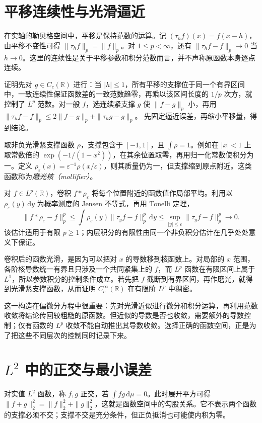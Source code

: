 \section{平移连续性与光滑逼近}
在实轴的勒贝格空间中，平移是保持范数的运算。记 $(\tau_hf)(x)=f(x-h)$，由平移不变性可得 $\|\tau_hf\|_p=\|f\|_p$。对 $1\leq p<\infty$，还有
$\|\tau_hf-f\|_p\to0$ 当 $h\to0$。这里的连续性是关于平移参数和积分范数而言，并不声称原函数本身逐点连续。

证明先对 $g\in C_c(\mathbb R)$ 进行：当 $|h|\leq1$，所有平移的支撑位于同一个有界区间中，一致连续性保证函数差的一致范数趋零，再乘以该区间长度的 $1/p$ 次方，就控制了 $L^p$ 范数。对一般 $f$，选连续紧支撑 $g$ 使 $\|f-g\|_p$ 小，再用
$\|\tau_hf-f\|_p\leq2\|f-g\|_p+\|\tau_hg-g\|_p$。
先固定逼近误差，再缩小平移量，得到结论。

取非负光滑紧支撑函数 $\rho$，支撑包含于 $[-1,1]$，且 $\int\rho=1$。例如在 $|x|<1$ 上取常数倍的 $\exp(-1/(1-x^2))$，在其余位置取零，再用归一化常数使积分为一。定义 $\rho_\varepsilon(x)=\varepsilon^{-1}\rho(x/\varepsilon)$，则其质量仍为一，但支撑缩到原点附近。这类函数称为\emph{磨光核（mollifier）}。

对 $f\in L^p(\mathbb R)$，卷积 $f*\rho_\varepsilon$ 将每个位置附近的函数值作局部平均。利用以 $\rho_\varepsilon(y)\,\mathrm dy$ 为概率测度的 Jensen 不等式，再用 Tonelli 定理，
\[
 \|f*\rho_\varepsilon-f\|_p^p
 \leq\int\rho_\varepsilon(y)\|\tau_yf-f\|_p^p\,\mathrm dy
 \leq\sup_{|y|\leq\varepsilon}\|\tau_yf-f\|_p^p\longrightarrow0.
\]
该估计适用于有限 $p\geq1$；内层积分的有限性由同一个非负积分估计在几乎处处意义下保证。

卷积后的函数光滑，是因为可以把对 $x$ 的导数移到核函数上。对局部的 $x$ 范围，各阶核导数统一有界且只涉及一个共同紧集上的 $f$，而 $L^p$ 函数在有限区间上属于 $L^1$，所以参数积分的控制条件成立。若先把 $f$ 截断到有界区间，再作磨光，就得到光滑紧支撑函数，从而证明 $C_c^\infty(\mathbb R)$ 在有限阶 $L^p$ 中稠密。

这一构造在偏微分方程中很重要：先对光滑近似进行微分和积分运算，再利用范数收敛将结论传回较粗糙的原函数。但近似的导数是否也收敛，需要额外的导数控制；仅有函数的 $L^p$ 收敛不能自动推出其导数收敛。选择正确的函数空间，正是为了把这些不同层次的控制同时记录下来。

\section{$L^2$ 中的正交与最小误差}
对实值 $L^2$ 函数，称 $f,g$ 正交，若 $\int fg\,\mathrm d\mu=0$。此时展开平方可得
$\|f+g\|_2^2=\|f\|_2^2+\|g\|_2^2$，这就是函数空间中的勾股关系。它不表示两个函数的支撑必须不交；支撑不交是充分条件，但正负抵消也可能使内积为零。

